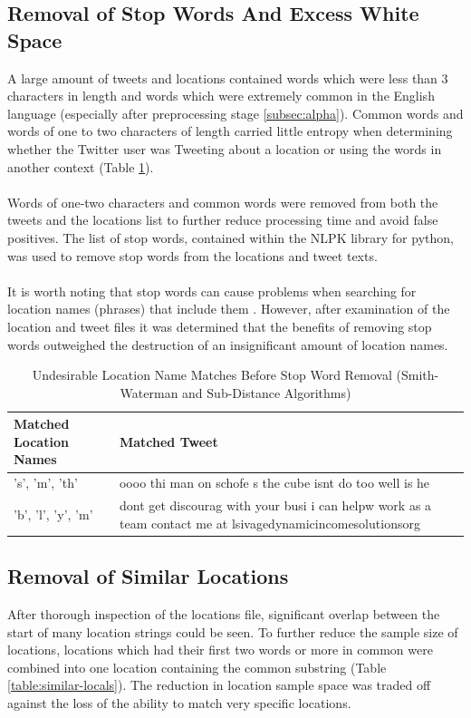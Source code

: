 \documentclass[11pt,a4paper]{article}
\begin{document}
\subsection{Removal of Stop Words And Excess White Space}
A large amount of tweets and locations contained words which were less than 3 characters in length and words which were extremely common in the English language (especially after preprocessing stage \ref{subsec:alpha}). Common words and words of one to two characters of length carried little entropy\citep{ra-stop} when determining whether the Twitter user was Tweeting about a location or using the words in another context (Table \ref{table:stop-words}).\\\\
Words of one-two characters and common words were removed from both the tweets and the locations list to further reduce processing time and avoid false positives. The list of stop words, contained within the NLPK library for python, was used to remove stop words from the locations and tweet texts.\\\\
It is worth noting that stop words can cause problems when searching for location names (phrases) that include them \citep{ra-stop}. However, after examination of the location and tweet files it was determined that the benefits of removing stop words outweighed the destruction of an insignificant amount of location names. 

\begin{table}[h]
	\centering
	\caption{Undesirable Location Name Matches Before Stop Word Removal (Smith-Waterman and Sub-Distance Algorithms)}
	\begin{tabular}{| l | p{10cm} |}
	\hline
	 \textbf{Matched Location Names} & \textbf{Matched Tweet}\\
	\hline
	's', 'm', 'th' & oooo thi man on schofe  s the cube isnt do too well is he\\
	\hline
	'b', 'l', 'y', 'm'  & dont get discourag with your busi i can helpw work as a team contact me at lsivagedynamicincomesolutionsorg\\
	\hline
	\end{tabular}
	\label{table:stop-words}
\end{table}

\subsection{Removal of Similar Locations}
After thorough inspection of the locations file, significant overlap between the start of many location strings could be seen. To further reduce the sample size of locations, locations which had their first two words or more in common were combined into one location containing the common substring (Table \ref{table:similar-locals}). The reduction in location sample space was traded off against the loss of the ability to match very specific locations.
\end{document}
